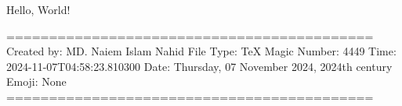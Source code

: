 Hello, World!

===========================================
Created by: MD. Naiem Islam Nahid
File Type: TeX
Magic Number: 4449
Time: 2024-11-07T04:58:23.810300
Date: Thursday, 07 November 2024, 2024th century
Emoji: None
===========================================
